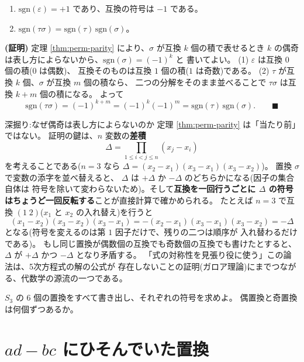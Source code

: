 \begin{teiri}[符号の計算規則]\label{thm:sgn-rules}
\begin{enumerate}
\item $\mathrm{sgn}(\varepsilon) = +1$ であり、互換の符号は $-1$ である。
\item $\mathrm{sgn}(\tau\sigma) = \mathrm{sgn}(\tau)\,\mathrm{sgn}(\sigma)$。
\end{enumerate}
\end{teiri}

\noindent\textbf{(証明)}\quad
定理 \ref{thm:perm-parity} により、$\sigma$ が互換 $k$ 個の積で表せるとき
$k$ の偶奇は表し方によらないから、$\mathrm{sgn}(\sigma) = (-1)^k$ と
書いてよい。
(1) $\varepsilon$ は互換 $0$ 個の積($0$ は偶数)、
互換そのものは互換 $1$ 個の積($1$ は奇数)である。
(2) $\tau$ が互換 $k$ 個、$\sigma$ が互換 $m$ 個の積なら、
二つの分解をそのまま並べることで $\tau\sigma$ は互換 $k + m$ 個の積になる。
よって
\[
\mathrm{sgn}(\tau\sigma) = (-1)^{k+m} = (-1)^k (-1)^m
= \mathrm{sgn}(\tau)\,\mathrm{sgn}(\sigma). \qquad\blacksquare
\]

\begin{itembox}[l]{深掘り:なぜ偶奇は表し方によらないのか}
定理 \ref{thm:perm-parity} は「当たり前」ではない。
証明の鍵は、$n$ 変数の\textbf{差積}
\[
\Delta = \prod_{1 \le i < j \le n} (x_j - x_i)
\]
を考えることである($n = 3$ なら
$\Delta = (x_2 - x_1)(x_3 - x_1)(x_3 - x_2)$)。
置換 $\sigma$ で変数の添字を並べ替えると、
$\Delta$ は $+\Delta$ か $-\Delta$ のどちらかになる(因子の集合自体は
符号を除いて変わらないため)。そして\textbf{互換を一回行うごとに
$\Delta$ の符号はちょうど一回反転する}ことが直接計算で確かめられる。
たとえば $n = 3$ で互換 $(1\;2)$($x_1$ と $x_2$ の入れ替え)を行うと
\[
(x_1 - x_2)(x_3 - x_2)(x_3 - x_1)
= -(x_2 - x_1)(x_3 - x_1)(x_3 - x_2) = -\Delta
\]
となる(符号を変えるのは第 $1$ 因子だけで、残りの二つは順序が
入れ替わるだけである)。
もし同じ置換が偶数個の互換でも奇数個の互換でも書けたとすると、
$\Delta$ が $+\Delta$ かつ $-\Delta$ となり矛盾する。
「式の対称性を見張り役に使う」この論法は、5次方程式の解の公式が
存在しないことの証明(ガロア理論)にまでつながる、代数学の源流の一つである。
\end{itembox}

\begin{mondai}\label{q:perm}
$S_3$ の $6$ 個の置換をすべて書き出し、それぞれの符号を求めよ。
偶置換と奇置換は何個ずつあるか。
\end{mondai}

\section{$ad - bc$ にひそんでいた置換}

